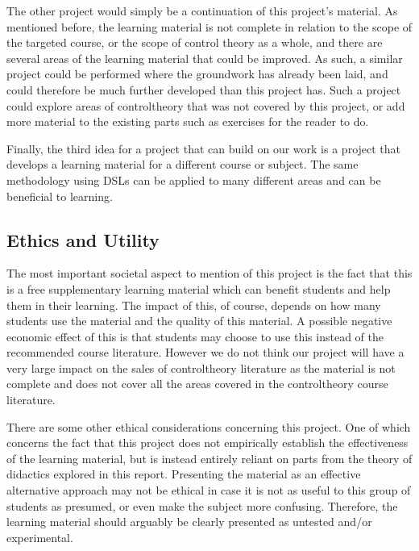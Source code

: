 The other project would simply be a continuation of this project's material. 
As mentioned before, the learning material is not complete in relation to the scope of the targeted course, or the scope of control theory as a whole, and there are several areas of the learning material that could be improved. As such, a similar project could be performed where the groundwork has already been laid, and could therefore be much further developed than this project has. Such a project could explore areas of \gls{controltheory} that was not covered by this project, or add more material to the existing parts such as exercises for the reader to do. 

Finally, the third idea for a project that can build on our work is a project that develops a learning material for a different course or subject. The same methodology using \gls{DSL}s can be applied to many different areas and can be beneficial to learning.

\subsection{Ethics and Utility}
The most important societal aspect to mention of this project is the fact that this is a free supplementary learning material which can benefit students and help them in their learning. The impact of this, of course, depends on how many students use the material and the quality of this material. A possible negative economic effect of this is that students may choose to use this instead of the recommended course literature. However we do not think our project will have a very large impact on the sales of \gls{controltheory} literature as the material is not complete and does not cover all the areas covered in the \gls{controltheory} course literature. 

There are some other ethical considerations concerning this project. One of which concerns the fact that this project does not empirically establish the effectiveness of the learning material, but is instead entirely reliant on parts from the theory of \gls{didactic}s explored in this report. Presenting the material as an effective alternative approach may not be ethical in case it is not as useful to this group of students as presumed, or even make the subject more confusing. Therefore, the learning material should arguably be clearly presented as untested and/or experimental.

